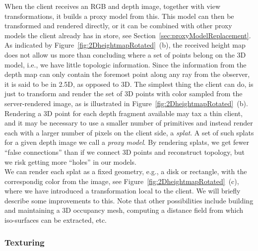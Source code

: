 \documentclass[10pt,conference,compsocconf]{IEEEtran}
\newcommand{\ie}{{i.e.}}
\newcommand{\eg}{{e.g.}}
\begin{document}
When the client receives an RGB and depth image, together with view
transformations, it builds a proxy model from this. This model can then be
transformed and rendered directly, or it can be combined with other proxy models
the client already has in store, see Section~\ref{sec:proxyModelReplacement}.
\\
As indicated by Figure~\ref{fig:2DheightmapRotated}~(b), the received height map
does not allow us more than concluding where a set of points belong on the 3D
model, \ie, we have little topologic information. Since the information from the
depth map can only contain the foremost point along any ray from the observer,
it is said to be in 2.5D, as opposed to 3D.  The simplest thing the client can
do, is just to transform and render the set of 3D points with color sampled from
the server-rendered image, as is illustrated in
Figure~\ref{fig:2DheightmapRotated}~(b).
\\
Rendering a 3D point for each depth fragment available may tax a thin client,
and it may be necessary to use a smaller number of primitives and instead render
each with a larger number of pixels on the client side, a {\em splat}.  A set of
such splats for a given depth image we call a {\em proxy model}. By rendering
splats, we get fewer ``false connections'' than if we connect 3D points and
reconstruct topology, but we risk getting more ``holes'' in our models.
\\
We can render each splat as a fixed geometry, \eg, a disk or rectangle, with the
correspondig color from the image, see Figure~\ref{fig:2DheightmapRotated}~(c),
where we have introduced a transformation local to the client.  We will briefly
describe some improvements to this. Note that other possibilities include
building and maintaining a 3D occupancy mesh, computing a distance field from
which iso-surfaces can be extracted, etc.

\subsubsection{Texturing}
\end{document}
